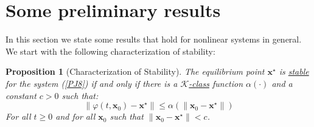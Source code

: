 \documentclass[a4paper,10pt,oneside]{book}
\newtheorem{proposition}[theorem]{Proposition}
\begin{document}
\section{Some preliminary results}
In this section we state some results that hold for nonlinear systems in general. 
We start with the following characterization of stability:
%
%
%
\begin{proposition}[Characterization of Stability]\label{K-class-stable}
 The equilibrium point $\mathbf x^\star$ is \hyperlink{stability-definition}{stable} for the system (\ref{PJ8}) if and only if
there is a \hyperlink{K-class}{$\mathcal K$-class} function $\alpha(\cdot)$ and a constant $c>0$ such that:
\begin{equation}\label{FMLKASFER23}
 \|\varphi(t,\mathbf x_0)-\mathbf x^\star\|\leq \alpha(\|\mathbf x_0-\mathbf x^\star\|)
\end{equation}
For all $t\geq 0$ and for all $\mathbf x_0$ such that $\|\mathbf x_0-\mathbf x^\star\|<c$.
\end{proposition}
\end{document}
